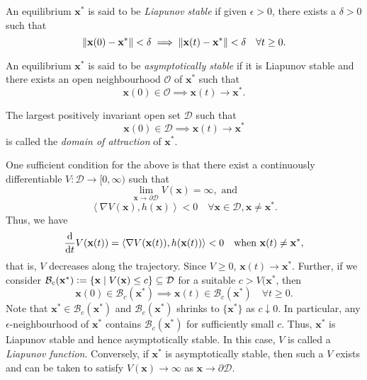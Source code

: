\begin{defn}
    An equilibrium $\mathbf{x}^*$ is said to be \emph{Liapunov stable} if given $\epsilon > 0$, there exists a $\delta > 0$ such that
    \[
        \norm{\mathbf{x}(0) - \mathbf{x}^*} < \delta \implies \norm{\mathbf{x}(t) - \mathbf{x}^*} < \delta \quad \forall t \geq 0.
    \]
\end{defn}
\begin{defn}
    An equilibrium $\mathbf{x}^*$ is said to be \emph{asymptotically stable} if it is Liapunov stable and there exists an open neighbourhood $\mathcal{O}$ of $\mathbf{x}^*$ such that 
    \[
        \mathbf{x}(0) \in \mathcal{O} \implies \mathbf{x}(t) \to \mathbf{x}^*.
    \]
\end{defn}
\begin{defn}
    The largest positively invariant open set $\mathcal{D}$ such that 
    \[
        \mathbf{x}(0) \in \mathcal{D} \implies \mathbf{x}(t) \to \mathbf{x}^*
    \]
    is called the \emph{domain of attraction} of $\mathbf{x}^*$. 
\end{defn}

One sufficient condition for the above is that there exist a continuously differentiable $V \colon \mathcal{D} \to [0,\infty)$ such that
\[
    \lim_{\mathbf{x} \to \partial \mathcal{D}} V(\mathbf{x}) = \infty, \text{ and}
\]
\[
    \left\langle \nabla V(\mathbf{x}), h(\mathbf{x})\right\rangle < 0 \quad \forall \mathbf{x} \in \mathcal{D}, \mathbf{x} \neq \mathbf{x}^*.
\]
Thus, we have
\[
    \frac{\mathrm{d}}{\mathrm{d} t}V(\mathbf{x}(t)) = \left\langle \nabla V(\mathbf{x}(t)), h(\mathbf{x}(t))\right\rangle < 0 \quad \text{when }\mathbf{x}(t) \neq \mathbf{x}^*,
\]
that is, $V$ decreases along the trajectory. Since $V \geq 0$, $\mathbf{x}(t) \to \mathbf{x}^*$. Further, if we consider $\mathcal{B}_c(\mathbf{x}^*) \vcentcolon= \{ \mathbf{x} \mid V(\mathbf{x}) \leq c \} \subseteq \mathcal{D}$ for a suitable $c > V(\mathbf{x}^*$, then 
\[
    \mathbf{x}(0) \in \mathcal{B}_c(\mathbf{x}^*) \implies \mathbf{x}(t) \in \mathcal{B}_c(\mathbf{x}^*) \quad \forall t \geq 0.
\]
Note that $\mathbf{x}^* \in \mathcal{B}_c(\mathbf{x}^*)$ and $\mathcal{B}_c(\mathbf{x}^*)$ shrinks to $\{\mathbf{x}^*\}$ as $c \downarrow 0$. In particular, any $\epsilon$-neighbourhood of $\mathbf{x}^*$ contains $\mathcal{B}_c(\mathbf{x}^*)$ for sufficiently small $c$. Thus, $\mathbf{x}^*$ is Liapunov stable and hence asymptotically stable. In this case, $V$ is called a \emph{Liapunov function}. Conversely, if $\mathbf{x}^*$ is asymptotically stable, then such a $V$ exists and can be taken to satisfy $V(\mathbf{x}) \to \infty$ as $\mathbf{x} \to \partial \mathcal{D}$.

